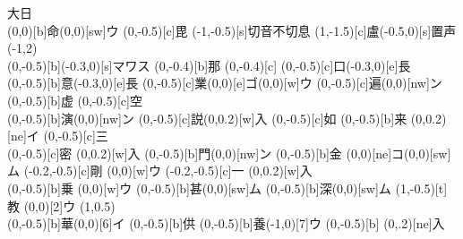 \documentclass[m_shidai]{subfiles}
\begin{document}
%
\HUGE
{\Huge 大日}\\
\def\gscale{0.4}
\karifu(0,0)[b]{命}{\moji(0,0)[sw]{ウ}\chi}
\karifu(0,-0.5)[c]{毘}{\chi\modori\chi%
            \hikidashi(-1,-0.5)[s]{切音不切息}\chikara{\c}\kak}
\karifu(1,-1.5)[c]{盧}{\kak\moji(-0.5,0)[s]{置声}\kili\kak\modori
            \shiyu{\k}\sho\kili\yurugu{\s}
	    \moveTo(-1,2)\yurikake{\hq}\kili\yurisori{\hq}
	    \kiri\woo\modori{}
	    \hqyu\kiri{}\hqyu}\\
%
\karifu(0,-0.5)[b]{}{\mawasu[1]{\c}\moji(-0.3,0)[s]{マワス}\modori\chi}
\karifu(0,-0.4)[b]{那}{\kili\woo\modoli\chi\矢[ne]}
\karifu(0,-0.4)[c]{}{\tsu}
\karifu(0,-0.5)[c]{口}{\chi\modori\woo\長[e]\kili\woo\矢[w]
            \modori\woo\moji(-0.3,0)[e]{長}}\\
%
\karifu(0,-0.5)[b]{意}{\woo\長[e]\kili\woo\矢[w]
            \modori\woo\moji(-0.3,0)[e]{長}}
\karifu(0,-0.5)[c]{業}{\moji(0,0)[e]{ゴ}\chikara{\w}\moji(0,0)[w]{ウ}
            \modoli\chi\kak\矢[s]\modori\kak\長[n]}
\karifu(0,-0.5)[c]{遍}{\kak\modori\chi\矢[ne]\moji(0,0)[nw]{ン}}
\karifu(0,-0.5)[b]{虚}{\jige\kili[sw]\woo\modoli\chi\矢[ne]}
\karifu(0,-0.5)[c]{空}{}\\
%
\karifu(0,-0.5)[b]{演}{\sho\modori\kak\modori\chi\moji(0,0)[nw]{ン}}
\karifu(0,-0.5)[c]{説}{\chi\modori\woo\長[e]\kili\woo\矢[w]
            \modori\woo\長[e]\tsu\moji(0,0.2)[w]{入}}
\karifu(0,-0.5)[c]{如}
       {\woo\長[e]\kili\woo\矢[w]\modori\woo\長[e]}
\karifu(0,-0.5)[b]{来}
       {\chikara{\w}\moji(0,0.2)[ne]{イ}\modoli\chi
        \kak\矢[s]\modori\kak}
\karifu(0,-0.5)[c]{三}{\kak\modori\chi\矢[ne]}\\
%
\karifu(0,-0.5)[c]{密}
       {\jige\kili[sw]\woo\modoli\chi\tsu\moji(0,0.2)[w]{入}}
\karifu(0,-0.5)[b]{門}{\moji(0,0)[nw]{ン}}
\karifu(0,-0.5)[b]{金}
       {\moji(0,0)[ne]{コ}\sho\modori\kak\moji(0,0)[sw]{ム}%
	\modori\chi\矢[ne]}
\karifu(-0.2,-0.5)[c]{剛}
       {\chi\moji(0,0)[w]{ウ}\modori\woo\kili\woo\modori\woo}
\karifu(-0.2,-0.5)[c]{一}
       {\woo\kili\woo\modori\woo\tsu\moji(0,0.2)[w]{入}}\\
%
\karifu(0,-0.5)[b]{乗}
       {\chikara{\w}\moji(0,0)[w]{ウ}\modoli\chi%
        \kak\矢[s]\modori\kak\長[4]}
\karifu(0,-0.5)[b]{甚}{\moji(0,0)[sw]{ム}\modoli\chi\kak}
\karifu(0,-0.5)[b]{深}{\moji(0,0)[sw]{ム}\irohane{\w}}
\karifu(1,-0.5)[t]{教}
       {\sori{\w}\moji(0,0)[2]{ウ}%
        \iromodori\sori{\w}\kak\kili%
	\moveTo(1,0.5)\sho\kiri%
	\chikara{\q}\modori\yurugu{\s}}\\
%
\karifu(0,-0.5)[b]{華}{\kak\modori\chi\kak\modori\kak\moji(0,0)[6]{イ}}
\karifu(0,-0.5)[b]{供}{\kak\modori\chi\矢[ne]}
\karifu(0,-0.5)[b]{養}{\yurikake{\c}\moji(-1,0)[7]{ウ}\kili\yurisori{\c}%
            \modori\woo\長[e]}
\karifu(0,-0.5)[b]{}
           {\woo{}\kili[sw]%
            \woo\modoli{}\chi\tsu\moji(0,.2)[ne]{入}}\\
\end{document}

